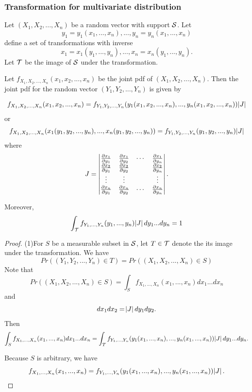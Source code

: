\begin{refsection}
\subsubsection{Transformation for multivariate distribution}



\begin{lemma}\cite[128]{hoggintroduction}
Let $(X_1,X_2,...,X_n)$ be a random vector with support $\mathcal{S}$. Let $$y_1=y_1(x_1,...,x_n),...,y_n=y_n(x_1,...,x_n)$$
define a set of transformations with inverse
$$x_1=x_1(y_1,...,y_n),...,x_n=x_n(y_1,...,y_n).$$
Let $\mathcal{T}$ be the image of $\mathcal{S}$ under the transformation.

Let $f_{X_1,X_2,...,X_n}(x_1,x_2,...,x_n)$ be the joint pdf of $(X_1,X_2,...,X_n)$. Then the joint pdf for the random vector $(Y_1,Y_2,...,Y_n)$ is given by 
	
	
	
	$$f_{X_1,X_2,...,X_n}(x_1,x_2,...,x_n) = f_{Y_1,Y_2,...,Y_n}(y_1(x_1,x_2,...,x_n),...,y_n(x_1,x_2,...,x_n))\abs{J}$$
or
	$$f_{X_1,X_2,...,X_n}(x_1(y_1,y_2,...,y_n),...,x_n(y_1,y_2,...,y_n)) = f_{Y_1,Y_2,...,Y_n}(y_1,y_2,...,y_n)\abs{J}$$
where	
	$$J=\begin{vmatrix}
	\frac{\partial x_1}{\partial y_1} & \frac{\partial x_1}{\partial y_2} & \cdots & \frac{\partial x_1}{\partial y_n} \\ 
\frac{\partial x_2}{\partial y_1}	& \frac{\partial x_2}{\partial y_2} &  & \frac{\partial x_2}{\partial y_n} \\ 
\vdots	& \vdots &  & \vdots \\ 
\frac{\partial x_n}{\partial y_1}	& \frac{\partial x_n}{\partial y_2} & \cdots & \frac{\partial x_n}{\partial y_n} 
	\end{vmatrix}.$$
	
Moreover, 
$$\int_{\mathcal{T}} f_{Y_1,...,Y_n}(y_1,...,y_n)\abs{J}dy_1 ... dy_n = 1$$	
\end{lemma}
\begin{proof}
(1)For $S$ be a measurable subset in $\mathcal{S}$, let $T\in \mathcal{T}$ denote the its image under the transformation.  We have
$$Pr((Y_1,Y_2,...,Y_n)\in T) = Pr((X_1,X_2,...,X_n)\in S)$$
Note that
$$Pr((X_1,X_2,...,X_n)\in S) = \int_S f_{X_1,...,X_n}(x_1,...,x_n)dx_1...dx_n$$
and $$dx_1dx_2 = \abs{J} dy_1dy_2.$$
Then
$$\int_S f_{X_1,...,X_n}(x_1,...,x_n)dx_1...dx_n = \int_Tf_{Y_1,...,Y_n}(y_1(x_1,...,x_n),...,y_n(x_1,...,x_n))\abs{J} dy_1...dy_n.$$

Because $S$ is arbitrary, we have
$$f_{X_1,...,X_n}(x_1,...,x_n) = f_{Y_1,...,Y_n}(y_1(x_1,...,x_n),...,y_n(x_1,...,x_n))\abs{J}.$$


\end{proof}
\end{refsection}
